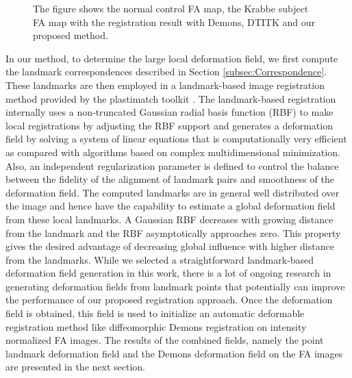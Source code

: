 \documentclass{llncs}
\begin{document}
\begin{figure}
    \label{fig:regMatch}
    \caption{The figure shows the normal control FA map, the Krabbe subject FA map with the registration result with Demons, DTITK and our proposed method.}
\end{figure}

In our method, to determine the large local deformation field, we first compute the landmark correspondences described in Section \ref{subsec:Correspondence}. These landmarks are then employed in a landmark-based image registration method provided by the plastimatch toolkit \cite{Sharp10}. The landmark-based registration internally uses a non-truncated Gaussian radial basis function (RBF) to make local registrations by adjusting the RBF support and generates a deformation field by solving a system of linear equations that is computationally very efficient as compared with algorithms based on complex multidimensional minimization. Also, an independent regularization parameter is defined to control the balance between the fidelity of the alignment of landmark pairs and smoothness of the deformation field. The computed landmarks are in general well distributed over the image and hence have the capability to estimate a global deformation field from these  local landmarks. A Gaussian RBF decreases with growing distance from the landmark and the RBF asymptotically approaches zero. This property gives the desired advantage of decreasing global influence with higher distance from the landmarks. While we selected a straightforward landmark-based deformation field generation in this work, there is a lot of ongoing research in generating deformation fields from landmark points that potentially can improve the performance of our proposed registration approach. Once the deformation field is obtained, this field is used to initialize an automatic deformable registration method like diffeomorphic Demons registration on intensity normalized FA images. The results of the combined fields, namely the point landmark deformation field and the Demons deformation field on the FA images are presented in the next section.
\end{document}
